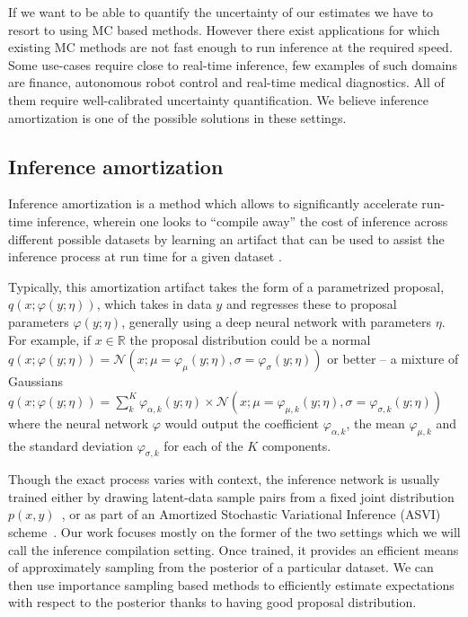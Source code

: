 \documentclass[12pt]{article}
\begin{document}
If we want to be able to quantify the uncertainty of our estimates we have to resort to using MC based methods.
However there exist applications for which existing MC methods are not fast enough to run inference at the required speed.
Some use-cases require close to real-time inference, few examples of such domains are finance, autonomous robot control and real-time medical diagnostics. 
All of them require well-calibrated uncertainty quantification.
We believe inference amortization is one of the possible solutions in these settings.




\subsection{Inference amortization}

Inference amortization is a method which allows to significantly accelerate run-time inference, wherein one looks to ``compile away'' the cost of inference
across different possible datasets
by learning an artifact that can be used to assist the inference process
at run time for a given dataset
\citep{StuhlmullerEtAl2013, VAE, RitchieEtAl2016, PaigeWood2016, LeEtAl2016, LeEtAl2017, FIVO, NaessethEtAl2017}.

Typically, this amortization
artifact takes the form of a parametrized proposal, $q(x ; \varphi(y; \eta))$, which takes
in data $y$ and regresses these to proposal parameters $\varphi(y; \eta)$, generally using
a deep neural network with parameters $\eta$.
For example, if $x \in \mathbb{R}$ 
the proposal distribution could be a normal 
$q(x ; \varphi(y; \eta)) = \mathcal{N}(x;\mu=\varphi_{\mu}(y; \eta),\sigma=\varphi_{\sigma}(y; \eta))$
or better -- a mixture of Gaussians
$q(x ; \varphi(y; \eta)) = \sum_k^K \varphi_{\alpha,k}(y; \eta) \times \mathcal{N}(x;\mu=\varphi_{\mu,k}(y; \eta),\sigma=\varphi_{\sigma,k}(y; \eta))$
where the neural network $\varphi$ would output 
the coefficient $\varphi_{\alpha,k}$,
the mean $\varphi_{\mu,k}$ and
the standard deviation $\varphi_{\sigma,k}$
for each of the $K$ components.

Though the exact process varies with context,
the inference network is usually trained either by drawing latent-data
sample pairs from a fixed joint distribution
$p(x,y)$~\citep{RitchieEtAl2016,PaigeWood2016,LeEtAl2016}, or 
as part of an Amortized Stochastic Variational Inference (ASVI) scheme~\citep{HoffmanEtAl2013,VAE,RezendeEtAl2014}.
Our work focuses mostly on the former of the two settings which we will call the inference compilation setting.
Once trained, it provides an efficient means of approximately
sampling from the posterior of a particular dataset.
We can then use importance sampling based methods to efficiently estimate expectations
with respect to the posterior thanks to having good proposal distribution.
\end{document}
